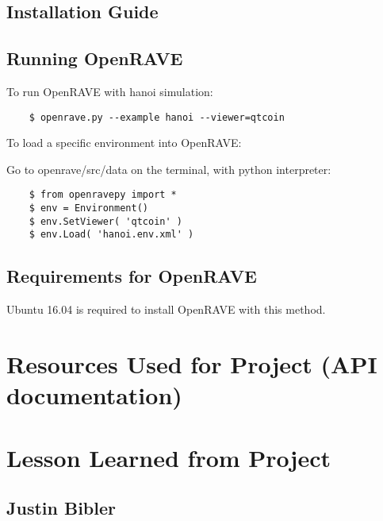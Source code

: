 \documentclass[10pt,journal,compsoc,draftclsnofoot]{IEEEtran}
\begin{document}
\begin{flushleft}
\newpage

\subsection{Installation Guide}


\newpage

\subsection{Running OpenRAVE}

To run OpenRAVE with hanoi simulation:

\begin{lstlisting}
    $ openrave.py --example hanoi --viewer=qtcoin
\end{lstlisting}

To load a specific environment into OpenRAVE:

Go to openrave/src/data on the terminal, with python interpreter:
\begin{lstlisting}
    $ from openravepy import *
    $ env = Environment()
    $ env.SetViewer( 'qtcoin' )	
    $ env.Load( 'hanoi.env.xml' )
\end{lstlisting}

\subsection{Requirements for OpenRAVE}
Ubuntu 16.04 is required to install OpenRAVE with this method.

\section{Resources Used for Project (API documentation)}


\newpage

\section{Lesson Learned from Project}

\subsection{Justin Bibler}



\end{flushleft}
\end{document}

